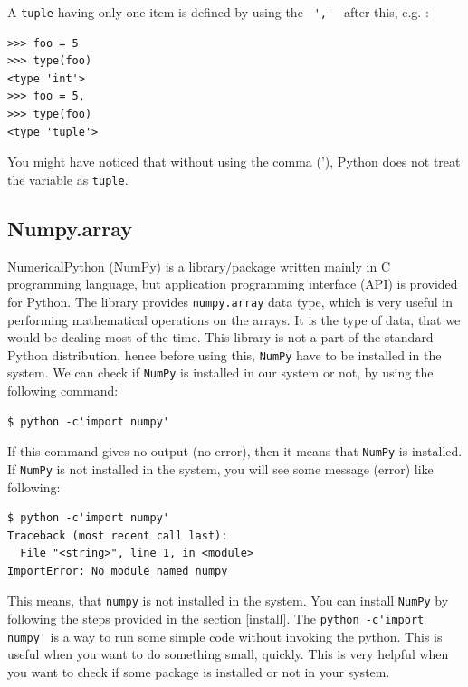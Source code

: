 \documentclass[10pt]{book}
\begin{document}
{A \verb"tuple" having only one item is defined by using the \verb" ',' " after this, e.g. :
\beforeverb \begin{verbatim}
>>> foo = 5
>>> type(foo)
<type 'int'>
>>> foo = 5,
>>> type(foo)
<type 'tuple'>
\end{verbatim} \afterverb
You might have noticed that without using the comma ('), Python does not treat the variable as \verb"tuple". 

\subsection{Numpy.array}
NumericalPython (NumPy) is a library/package written mainly in C programming language, but application programming interface (API) is provided for Python. The library provides \verb"numpy.array" data type, which is very useful in performing mathematical operations on the arrays. It is the type of data, that we would be dealing most of the time. This library is not a part of the standard Python distribution, hence before using this, \verb"NumPy" have to be installed in the system. We can check if \verb"NumPy" is installed in our system or not, by using the following command:
\beforeverb \begin{verbatim}
$ python -c'import numpy'
\end{verbatim} \afterverb

If this command gives no output (no error), then it means that \verb"NumPy" is installed. If \verb"NumPy" is not installed in the system, you will see some message (error) like following:
\beforeverb
\begin{verbatim}
$ python -c'import numpy'
Traceback (most recent call last):
  File "<string>", line 1, in <module>
ImportError: No module named numpy
\end{verbatim} \afterverb

This means, that \verb"numpy" is not installed in the system. You can install \verb"NumPy" by following the steps provided in the section \ref{install}. The \verb"python -c'import numpy'" is a way to run some simple code without invoking the python. This is useful when you want to do something small, quickly. This is very helpful when you want to check if some package is installed or not in your system. \\

}
\end{document}
